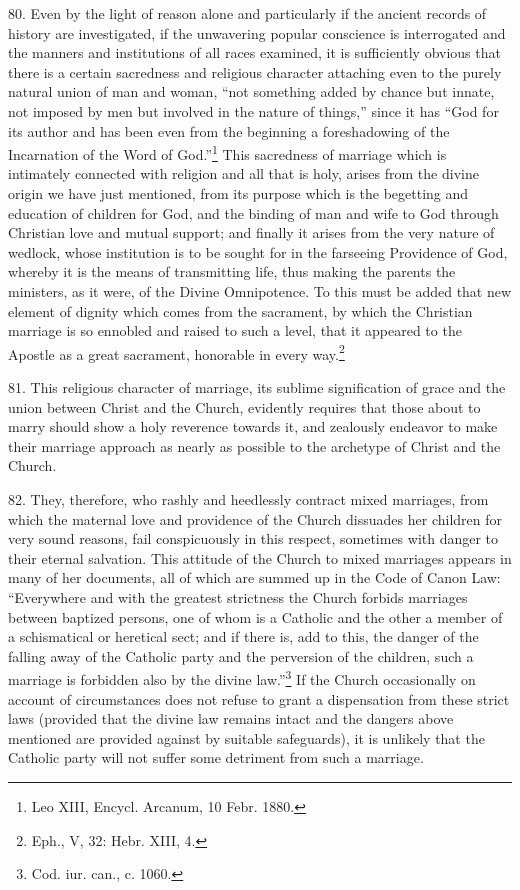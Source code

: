 \documentclass[12pt,a4paper]{book}
\begin{document}
80. Even by the light of reason alone and particularly if the ancient records of history are investigated, if the unwavering popular conscience is interrogated and the manners and institutions of all races examined, it is sufficiently obvious that there is a certain sacredness and religious character attaching even to the purely natural union of man and woman, ``not something added by chance but innate, not imposed by men but involved in the nature of things,'' since it has ``God for its author and has been even from the beginning a foreshadowing of the Incarnation of the Word of God.''\footnote{Leo XIII, Encycl. Arcanum, 10 Febr. 1880.} This sacredness of marriage which is intimately connected with religion and all that is holy, arises from the divine origin we have just mentioned, from its purpose which is the begetting and education of children for God, and the binding of man and wife to God through Christian love and mutual support; and finally it arises from the very nature of wedlock, whose institution is to be sought for in the farseeing Providence of God, whereby it is the means of transmitting life, thus making the parents the ministers, as it were, of the Divine Omnipotence. To this must be added that new element of dignity which comes from the sacrament, by which the Christian marriage is so ennobled and raised to such a level, that it appeared to the Apostle as a great sacrament, honorable in every way.\footnote{Eph., V, 32: Hebr. XIII, 4.}

81. This religious character of marriage, its sublime signification of grace and the union between Christ and the Church, evidently requires that those about to marry should show a holy reverence towards it, and zealously endeavor to make their marriage approach as nearly as possible to the archetype of Christ and the Church.

82. They, therefore, who rashly and heedlessly contract mixed marriages, from which the maternal love and providence of the Church dissuades her children for very sound reasons, fail conspicuously in this respect, sometimes with danger to their eternal salvation. This attitude of the Church to mixed marriages appears in many of her documents, all of which are summed up in the Code of Canon Law: ``Everywhere and with the greatest strictness the Church forbids marriages between baptized persons, one of whom is a Catholic and the other a member of a schismatical or heretical sect; and if there is, add to this, the danger of the falling away of the Catholic party and the perversion of the children, such a marriage is forbidden also by the divine law.''\footnote{Cod. iur. can., c. 1060.} If the Church occasionally on account of circumstances does not refuse to grant a dispensation from these strict laws (provided that the divine law remains intact and the dangers above mentioned are provided against by suitable safeguards), it is unlikely that the Catholic party will not suffer some detriment from such a marriage.
\end{document}
